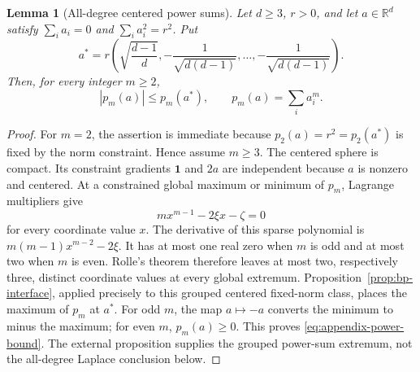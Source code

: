 \documentclass[11pt,a4paper]{article}
\newtheorem{lemma}[theorem]{Lemma}
\theoremstyle{remark}
\newcommand{\R}{\mathbb{R}}
\begin{document}
\begin{lemma}[All-degree centered power sums]
\label{lem:appendix-powers}
Let $d\ge3$, $r>0$, and let $a\in\R^d$ satisfy
$\sum_i a_i=0$ and $\sum_i a_i^2=r^2$.  Put
\begin{equation}
 a^*=r\left(\sqrt{\frac{d-1}{d}},
 -\frac1{\sqrt{d(d-1)}},\ldots,
 -\frac1{\sqrt{d(d-1)}}\right).
 \label{eq:appendix-spike}
\end{equation}
Then, for every integer $m\ge2$,
\begin{equation}
 |p_m(a)|\le p_m(a^*),\qquad p_m(a)=\sum_i a_i^m.
 \label{eq:appendix-power-bound}
\end{equation}
\end{lemma}

\begin{proof}
For $m=2$, the assertion is immediate because
$p_2(a)=r^2=p_2(a^*)$ is fixed by the norm constraint.  Hence assume $m\ge3$.
The centered sphere is compact.  Its constraint gradients $\mathbf 1$ and $2a$
are independent because $a$ is nonzero and centered.  At a constrained global
maximum or minimum of $p_m$, Lagrange multipliers give
\begin{equation}
 mx^{m-1}-2\xi x-\zeta=0
 \label{eq:appendix-lagrange}
\end{equation}
for every coordinate value $x$.  The derivative of this sparse polynomial is
$m(m-1)x^{m-2}-2\xi$.  It has at most one real zero when $m$ is odd and at
most two when $m$ is even.  Rolle's theorem therefore leaves at most two,
respectively three, distinct coordinate values at every global extremum.
Proposition~\ref{prop:bp-interface}, applied precisely to this grouped
centered fixed-norm class, places the maximum of $p_m$ at $a^*$.  For odd
$m$, the map $a\mapsto-a$ converts the
minimum to minus the maximum; for even $m$, $p_m(a)\ge0$.  This proves
\eqref{eq:appendix-power-bound}.  The external proposition supplies the
grouped power-sum extremum, not the all-degree Laplace conclusion below.
\end{proof}
\end{document}
